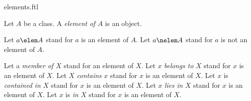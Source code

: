 \documentclass{naproche-library}
\begin{document}
\begin{smodule}[title=Elements of Classes]{elements.ftl}



\begin{fakeforthel}
  \begin{signature}
    Let $A$ be a class.
    A \emph{element of $A$} is an object.
  \end{signature}
\end{fakeforthel}

\begin{forthel}
  \begin{convention}
    Let \emph{$a \elem A$} stand for $a$ is an element of $A$.
    Let \emph{$a \nelem A$} stand for $a$ is not an element of $A$.

    Let a \emph{member of $X$} stand for an element of $X$.
    Let $x$ \emph{belongs to $X$} stand for $x$ is an element of $X$.
    Let $X$ \emph{contains $x$} stand for $x$ is an element of $X$.
    Let $x$ is \emph{contained in $X$} stand for $x$ is an element of $X$.
    Let $x$ \emph{lies in $X$} stand for $x$ is an element of $X$.
    Let $x$ is \emph{in $X$} stand for $x$ is an element of $X$.
  \end{convention}
\end{forthel}

\end{smodule}
\end{document}
